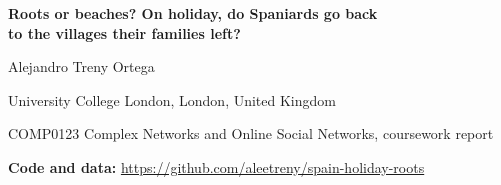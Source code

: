 \documentclass[11pt]{article}
\begin{document}
\begin{center}
{\LARGE\bfseries Roots or beaches? On holiday, do Spaniards go back\\[2pt] to the villages their families left?\par}
\vspace{12pt}
{\large Alejandro Treny Ortega\par}
\smallskip
University College London, London, United Kingdom\par
\smallskip
{\small COMP0123 Complex Networks and Online Social Networks, coursework report\par}
\end{center}

\begin{abstract}

\end{abstract}



\noindent\textbf{Code and data:} \url{https://github.com/aleetreny/spain-holiday-roots}

\vspace{14pt}
{\small
\setlength{\parskip}{0pt}
\renewcommand{\contentsname}{\normalsize Contents}
\setcounter{tocdepth}{1}
\tableofcontents
}
\clearpage


\clearpage


\clearpage


\clearpage


\clearpage






\end{document}
